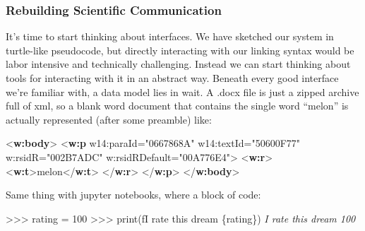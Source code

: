 \documentclass[10pt]{article}
\newenvironment{Shaded}{}{}
\newcommand{\BuiltInTok}[1]{#1}
\newcommand{\CommentTok}[1]{\textcolor[rgb]{0.38,0.63,0.69}{\textit{#1}}}
\newcommand{\DecValTok}[1]{\textcolor[rgb]{0.25,0.63,0.44}{#1}}
\newcommand{\KeywordTok}[1]{\textcolor[rgb]{0.00,0.44,0.13}{\textbf{#1}}}
\newcommand{\NormalTok}[1]{#1}
\newcommand{\OperatorTok}[1]{\textcolor[rgb]{0.40,0.40,0.40}{#1}}
\newcommand{\OtherTok}[1]{\textcolor[rgb]{0.00,0.44,0.13}{#1}}
\newcommand{\SpecialCharTok}[1]{\textcolor[rgb]{0.25,0.44,0.63}{#1}}
\newcommand{\SpecialStringTok}[1]{\textcolor[rgb]{0.73,0.40,0.53}{#1}}
\newcommand{\StringTok}[1]{\textcolor[rgb]{0.25,0.44,0.63}{#1}}
\begin{document}
\hypertarget{rebuilding-scientific-communication}{%
\subsubsection{Rebuilding Scientific
Communication}\label{rebuilding-scientific-communication}}


\begin{multicols}{2}
 It's time to start thinking about interfaces. We have
sketched our system in turtle-like pseudocode, but directly interacting
with our linking syntax would be labor intensive and technically
challenging. Instead we can start thinking about tools for interacting
with it in an abstract way. Beneath every good interface we're familiar
with, a data model lies in wait. A .docx file is just a zipped archive
full of xml, so a blank word document that contains the single word
``melon'' is actually represented (after some preamble) like:

\begin{Shaded}
\begin{Highlighting}[]
\NormalTok{\textless{}}\KeywordTok{w:body}\NormalTok{\textgreater{}}
\NormalTok{  \textless{}}\KeywordTok{w:p} 
\OtherTok{    w14:paraId=}\StringTok{"0667868A"} 
\OtherTok{    w14:textId=}\StringTok{"50600F77"} 
\OtherTok{    w:rsidR=}\StringTok{"002B7ADC"} 
\OtherTok{    w:rsidRDefault=}\StringTok{"00A776E4"}\NormalTok{\textgreater{}}
\NormalTok{    \textless{}}\KeywordTok{w:r}\NormalTok{\textgreater{}}
\NormalTok{        \textless{}}\KeywordTok{w:t}\NormalTok{\textgreater{}melon\textless{}/}\KeywordTok{w:t}\NormalTok{\textgreater{}}
\NormalTok{    \textless{}/}\KeywordTok{w:r}\NormalTok{\textgreater{}}
\NormalTok{  \textless{}/}\KeywordTok{w:p}\NormalTok{\textgreater{}  }
\NormalTok{\textless{}/}\KeywordTok{w:body}\NormalTok{\textgreater{}}
\end{Highlighting}
\end{Shaded}

Same thing with jupyter notebooks, where a block of code:

\begin{Shaded}
\begin{Highlighting}[]
\OperatorTok{\textgreater{}\textgreater{}\textgreater{}}\NormalTok{ rating }\OperatorTok{=} \DecValTok{100}
\OperatorTok{\textgreater{}\textgreater{}\textgreater{}} \BuiltInTok{print}\NormalTok{(}\SpecialStringTok{f\textquotesingle{}I rate this dream }\SpecialCharTok{\{}\NormalTok{rating}\SpecialCharTok{\}}\SpecialStringTok{\textquotesingle{}}\NormalTok{)}
\CommentTok{\textquotesingle{}I rate this dream 100\textquotesingle{}}
\end{Highlighting}
\end{Shaded}


\end{multicols}
\end{document}
